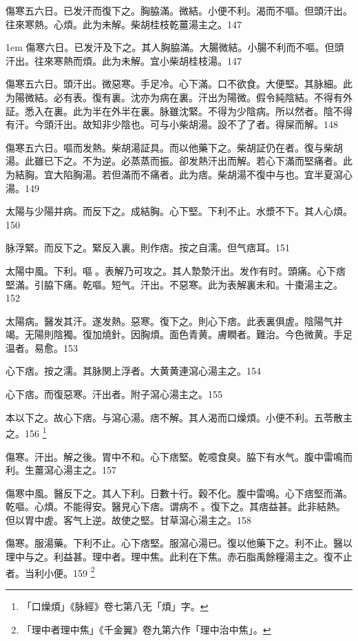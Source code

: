 傷寒五六日。已发汗而復下之。胸脇滿。微結。小便不利。渴而不嘔。但頭汗出。往來寒熱。心煩。此为未解。柴胡桂枝乾薑湯主之。147

\hangindent 1em
傷寒六日。已发汗及下之。其人胸脇滿。大腸微結。小腸不利而不嘔。但頭汗出。往來寒熱而煩。此为未解。宜小柴胡桂枝湯。{\shenghui}147

傷寒五六日。頭汗出。微惡寒。手足冷。心下滿。口不欲食。大便堅。其脉細。此为陽微結。必有表。復有裏。沈亦为病在裏。汗出为陽微。假令純陰結。不得有外証。悉入在裏。此为半在外半在裏。脉雖沈緊。不得为少陰病。所以然者。陰不得有汗。今頭汗出。故知非少陰也。可与{\khaai 小}柴胡湯。設不了了者。得屎而解。148

傷寒五六日。嘔而发熱。柴胡湯証具。而以他藥下之。柴胡証仍在者。復与柴胡湯。此雖已下之。不为逆。必蒸蒸而振。卻发熱汗出而解。若心下滿而堅痛者。此为結胸。宜大陷胸湯。若但滿而不痛者。此为痞。柴胡{\khaai 湯}不復中与也。宜半夏瀉心湯。149

太陽与少陽并病。而反下之。{\khaai 成}結胸。心下堅。下利不止。水漿不下。其人心煩。150

脉浮緊。而反下之。緊反入裏。則作痞。按之自濡。但气痞耳。151

太陽中風。下利。嘔{\sungii 𠱘}。表解乃可攻之。其人漐漐汗出。发作有时。頭痛。心下痞堅滿。引脇下痛。乾嘔。短气。汗出。不惡寒。此为表解裏未和。十棗湯主之。152

太陽病。醫发其汗。遂发熱。惡寒。復下之。則心下痞。此表裏俱虗。陰陽气并竭。无陽則陰獨。復加燒針。因胸煩。面色青黄。膚瞤者。難治。今色微黄。手足温者。易愈。153

心下痞。按之濡。其脉関上浮者。大黄{\khaai 黄連}瀉心湯主之。154

心下痞。而復惡寒。汗出者。附子瀉心湯主之。155

本以下之。故心下痞。与瀉心湯。痞不解。其人渴而口燥{\khaai 煩}。小便不利。五苓散主之。156
	\footnote{
		「口燥煩」《脉經》卷七第八无「煩」字。
	}

傷寒。汗出。解之後。胃中不和。心下痞堅。乾噫食臭。脇下有水气。腹中雷鳴而利。生薑瀉心湯主之。157

傷寒中風。醫反下之。其人下利。日數十行。穀不化。腹中雷鳴。心下痞堅而滿。乾嘔。心煩。不{\khaai 能}得安。醫見心下痞。谓病不{\sungii 𥁞}。復下之。其痞益甚。此非結熱。但以胃中虗。客气上逆。故使之堅。甘草瀉心湯主之。158

傷寒。服湯藥。下利不止。心下痞堅。服瀉心湯已。復以他藥下之。利不止。醫以理中与之。利益甚。理中者。理中焦。此利在下焦。赤石脂禹餘糧湯主之。復不止者。当利小便。159
	\footnote{
		「理中者理中焦」《千金翼》卷九第六作「理中治中焦」。
	}

